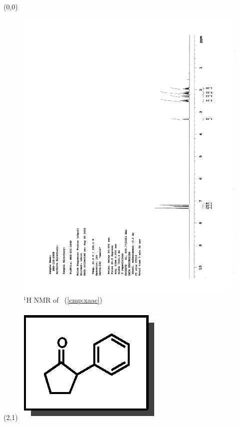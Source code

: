 \begin{textblock}{20}(0,0)
\begin{figure}[htb]
\caption{$^1$H NMR of \CMPxaac\ (\ref{cmp:xaac})}
\includegraphics[scale=0.75, trim = 0mm 0mm 0mm 5mm,
clip]{chp_asymmetric/images/nmr/xaacH}
\vspace{-100pt}
\end{figure}
\end{textblock}
\begin{textblock}{1}(2,1)
\includegraphics[scale=0.8, angle=90]{chp_asymmetric/images/xaac}
\end{textblock}
